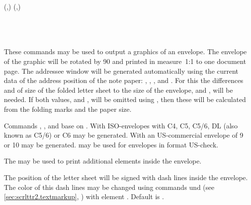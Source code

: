\begin{Declaration}
  (,)%
                      (,)%
                      \\
  \\
  \\
  \\
\end{Declaration}
%
%
%
%
%
These commands may be used to output a graphics of an envelope. The envelope
of the graphic will be rotated by 90\textdegree{} and printed in measure~1:1
to one document page. The addressee window will be generated automatically
using the current data of the address position of the note paper:
, , , and
. For this the differences  and
 of size of the folded letter sheet to the size of the
envelope,  and , will be needed. If both values,
 and , will be omitted using
, then these will be calculated from the folding marks and
the paper size.

Commands , , and
 base on . With 
ISO-envelopes with  C4, C5, C5/6, DL (also known as C5/6) or C6
may be generated. With  an US-commercial envelope of
 9 or 10 may be generated.  may be used for
envelopes in format US-check.

The  may be used to print additional elements inside the
envelope.

%
The position of the letter sheet will be signed with dash lines inside the
envelope. The color of this dash lines may be changed using commands
 und  (see
\autoref{sec:scrlttr2.textmarkup},
) with element
. Default is
.%
%
%


